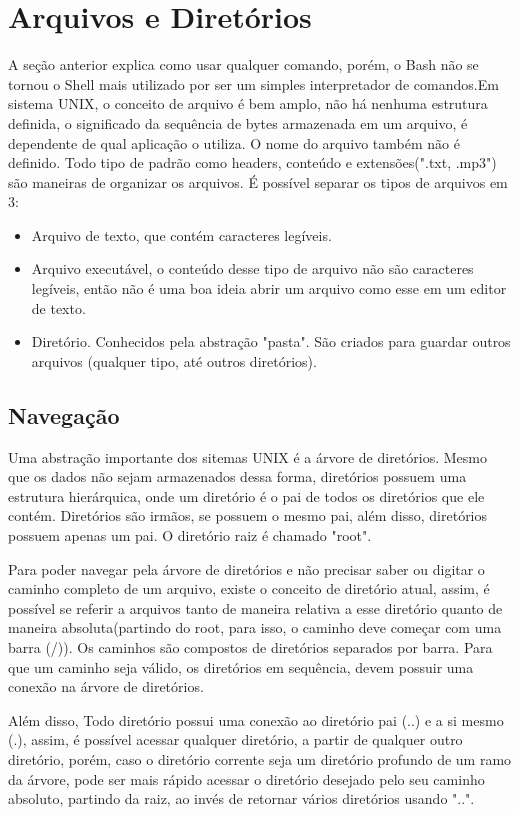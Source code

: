 \documentclass[oneside, 11 pt]{article}
\begin{document}
	\section{Arquivos e Diretórios}
	 A seção anterior explica como usar qualquer comando, porém, o Bash não se tornou o Shell mais utilizado por ser um simples interpretador de comandos.Em sistema UNIX, o conceito de arquivo é bem amplo, não há nenhuma estrutura definida, o significado da sequência de bytes armazenada em um arquivo, é dependente de qual aplicação o utiliza. O nome do arquivo também não é definido. Todo tipo de padrão como headers, conteúdo e extensões(".txt, .mp3") são maneiras de organizar os arquivos. É possível separar os tipos de arquivos em 3:
	\begin{itemize}
		\item Arquivo de texto, que contém caracteres legíveis.
		\item Arquivo executável, o conteúdo desse tipo de arquivo não são caracteres legíveis, então não é uma boa ideia abrir um arquivo como esse em um editor de texto.
		\item Diretório. Conhecidos pela abstração "pasta". São criados para guardar outros arquivos (qualquer tipo, até outros diretórios).
	\end{itemize}
	\subsection{Navegação}
	Uma abstração importante dos sitemas UNIX é a árvore de diretórios. Mesmo que os dados não sejam armazenados dessa forma, diretórios possuem uma estrutura hierárquica, onde um diretório é o pai de todos os diretórios que ele contém. Diretórios são irmãos, se possuem o mesmo pai, além disso, diretórios possuem apenas um pai. O diretório raiz é chamado "root".
	
	Para poder navegar pela árvore de diretórios e não precisar saber ou digitar o caminho completo de um arquivo, existe o conceito de diretório atual, assim, é possível se referir a arquivos tanto de maneira relativa a esse diretório quanto de maneira absoluta(partindo do root, para isso, o caminho deve começar com uma barra (/)). Os caminhos são compostos de diretórios separados por barra. Para que um caminho seja válido, os diretórios em sequência, devem possuir uma conexão na árvore de diretórios.
	
	Além disso, Todo diretório possui uma conexão ao diretório pai (..) e a si mesmo (.), assim, é possível acessar qualquer diretório, a partir de qualquer outro diretório, porém, caso o diretório corrente seja um diretório profundo de um ramo da árvore, pode ser mais rápido acessar o diretório desejado pelo seu caminho absoluto, partindo da raiz, ao invés de retornar vários diretórios usando "..".
	
\end{document}
